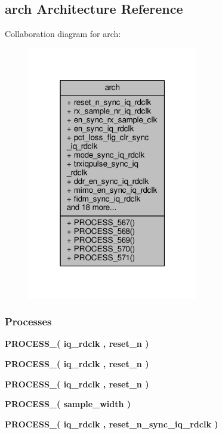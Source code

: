 \subsection{arch Architecture Reference}
\label{classtx__path__top_1_1arch}


Collaboration diagram for arch\+:\nopagebreak
\begin{figure}[H]
\begin{center}
\leavevmode
\includegraphics[width=211pt]{da/d32/classtx__path__top_1_1arch__coll__graph}
\end{center}
\end{figure}
\subsubsection*{Processes}
 \begin{DoxyCompactItemize}
\item 
{\bf P\+R\+O\+C\+E\+S\+S\+\_}{\bfseries  ( {\bfseries {\bfseries {\bf iq\+\_\+rdclk}} \textcolor{vhdlchar}{ }} , {\bfseries {\bfseries {\bf reset\+\_\+n}} \textcolor{vhdlchar}{ }} )}
\item 
{\bf P\+R\+O\+C\+E\+S\+S\+\_}{\bfseries  ( {\bfseries {\bfseries {\bf iq\+\_\+rdclk}} \textcolor{vhdlchar}{ }} , {\bfseries {\bfseries {\bf reset\+\_\+n}} \textcolor{vhdlchar}{ }} )}
\item 
{\bf P\+R\+O\+C\+E\+S\+S\+\_}{\bfseries  ( {\bfseries {\bfseries {\bf iq\+\_\+rdclk}} \textcolor{vhdlchar}{ }} , {\bfseries {\bfseries {\bf reset\+\_\+n}} \textcolor{vhdlchar}{ }} )}
\item 
{\bf P\+R\+O\+C\+E\+S\+S\+\_}{\bfseries  ( {\bfseries {\bfseries {\bf sample\+\_\+width}} \textcolor{vhdlchar}{ }} )}
\item 
{\bf P\+R\+O\+C\+E\+S\+S\+\_}{\bfseries  ( {\bfseries {\bfseries {\bf iq\+\_\+rdclk}} \textcolor{vhdlchar}{ }} , {\bfseries {\bfseries {\bf reset\+\_\+n\+\_\+sync\+\_\+iq\+\_\+rdclk}} \textcolor{vhdlchar}{ }} )}
\end{DoxyCompactItemize}
